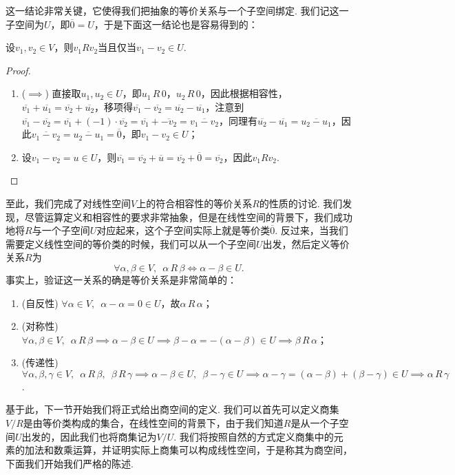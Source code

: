 这一结论非常关键，它使得我们把抽象的等价关系与一个子空间绑定. 我们记这一子空间为$U$，即$\overline{0}=U$，于是下面这一结论也是容易得到的：
\begin{theorem}{}{}
    设$v_1,v_2\in V$，则$v_1Rv_2$当且仅当$v_1-v_2\in U$.
\end{theorem}
\begin{proof}
    \begin{enumerate}
        \item ($\implies$) 直接取$u_1,u_2\in U$，即$u_1\,R\,0$，$u_2\,R\,0$，因此根据相容性，$\overline{v_1}+\overline{u_1}=\overline{v_2}+\overline{u_2}$，移项得$\overline{v_1}-\overline{v_2}=\overline{u_2}-\overline{u_1}$，注意到$\overline{v_1}-\overline{v_2}=\overline{v_1}+(-1)\cdot\overline{v_2}=\overline{v_1}+\overline{-v_2}=\overline{v_1-v_2}$，同理有$\overline{u_2}-\overline{u_1}=\overline{u_2-u_1}$，因此$\overline{v_1-v_2}=\overline{u_2-u_1}=\overline{0}$，即$v_1-v_2\in U$；
        \item 设$v_1-v_2=u\in U$，则$\overline{v_1}=\overline{v_2}+\overline{u}=\overline{v_2}+\overline{0}=\overline{v_2}$，因此$v_1Rv_2$.
    \end{enumerate}
\end{proof}

至此，我们完成了对线性空间$V$上的符合相容性的等价关系$R$的性质的讨论. 我们发现，尽管运算定义和相容性的要求非常抽象，但是在线性空间的背景下，我们成功地将$R$与一个子空间$U$对应起来，这个子空间实际上就是等价类$\overline{0}$. 反过来，当我们需要定义线性空间的等价类的时候，我们可以从一个子空间$U$出发，然后定义等价关系$R$为
\begin{equation} \label{eq:10:线性空间等价关系}
    \forall\alpha,\beta\in V,\enspace\alpha\,R\,\beta\iff \alpha-\beta\in U.
\end{equation}
事实上，验证这一关系的确是等价关系是非常简单的：
\begin{enumerate}
    \item (自反性) $\forall \alpha\in V,\enspace\alpha-\alpha=0\in U$，故$\alpha\,R\,\alpha$；

    \item (对称性) $\forall \alpha,\beta\in V,\enspace\alpha\,R\,\beta\implies \alpha-\beta\in U\implies \beta-\alpha=-(\alpha-\beta)\in U\implies \beta\,R\,\alpha$；

    \item (传递性) $\forall \alpha,\beta,\gamma\in V,\enspace\alpha\,R\,\beta,\enspace\beta\,R\,\gamma\implies \alpha-\beta\in U,\enspace\beta-\gamma\in U\implies \alpha-\gamma=(\alpha-\beta)+(\beta-\gamma)\in U\implies \alpha\,R\,\gamma$.
\end{enumerate}
基于此，下一节开始我们将正式给出商空间的定义. 我们可以首先可以定义商集$V/R$是由等价类构成的集合，在线性空间的背景下，由于我们知道$R$是从一个子空间$U$出发的，因此我们也将商集记为$V/U$. 我们将按照自然的方式定义商集中的元素的加法和数乘运算，并证明实际上商集可以构成线性空间，于是称其为商空间，下面我们开始我们严格的陈述.

